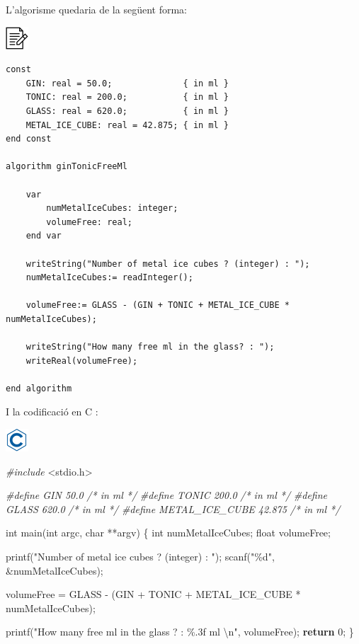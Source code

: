 \documentclass[
]{book}
\newenvironment{Shaded}{\begin{snugshade}}{\end{snugshade}}
\newcommand{\CommentTok}[1]{\textcolor[rgb]{0.56,0.35,0.01}{\textit{#1}}}
\newcommand{\ControlFlowTok}[1]{\textcolor[rgb]{0.13,0.29,0.53}{\textbf{#1}}}
\newcommand{\DataTypeTok}[1]{\textcolor[rgb]{0.13,0.29,0.53}{#1}}
\newcommand{\DecValTok}[1]{\textcolor[rgb]{0.00,0.00,0.81}{#1}}
\newcommand{\ImportTok}[1]{#1}
\newcommand{\NormalTok}[1]{#1}
\newcommand{\PreprocessorTok}[1]{\textcolor[rgb]{0.56,0.35,0.01}{\textit{#1}}}
\newcommand{\SpecialCharTok}[1]{\textcolor[rgb]{0.00,0.00,0.00}{#1}}
\newcommand{\StringTok}[1]{\textcolor[rgb]{0.31,0.60,0.02}{#1}}
\begin{document}
L'algorisme quedaria de la següent forma:

\includegraphics{./img/alg.png}

\begin{verbatim}
const
    GIN: real = 50.0;              { in ml }
    TONIC: real = 200.0;           { in ml }
    GLASS: real = 620.0;           { in ml }
    METAL_ICE_CUBE: real = 42.875; { in ml }
end const

algorithm ginTonicFreeMl

    var
        numMetalIceCubes: integer;
        volumeFree: real;
    end var

    writeString("Number of metal ice cubes ? (integer) : ");
    numMetalIceCubes:= readInteger();

    volumeFree:= GLASS - (GIN + TONIC + METAL_ICE_CUBE * numMetalIceCubes);

    writeString("How many free ml in the glass? : ");
    writeReal(volumeFree);

end algorithm
\end{verbatim}

I la codificació en C :

\includegraphics{./img/c.png}

\begin{Shaded}
\begin{Highlighting}[]
\PreprocessorTok{\#include }\ImportTok{\textless{}stdio.h\textgreater{}}

\PreprocessorTok{\#define GIN 50.0              }\CommentTok{/* in ml */}
\PreprocessorTok{\#define TONIC 200.0           }\CommentTok{/* in ml */}
\PreprocessorTok{\#define GLASS 620.0           }\CommentTok{/* in ml */}
\PreprocessorTok{\#define METAL\_ICE\_CUBE 42.875 }\CommentTok{/* in ml */}

\DataTypeTok{int}\NormalTok{ main(}\DataTypeTok{int}\NormalTok{ argc, }\DataTypeTok{char}\NormalTok{ **argv) \{}
    \DataTypeTok{int}\NormalTok{ numMetalIceCubes;}
    \DataTypeTok{float}\NormalTok{ volumeFree;}

\NormalTok{    printf(}\StringTok{"Number of metal ice cubes ? (integer) : "}\NormalTok{);}
\NormalTok{    scanf(}\StringTok{"\%d"}\NormalTok{, \&numMetalIceCubes);}

\NormalTok{    volumeFree = GLASS {-} (GIN + TONIC + METAL\_ICE\_CUBE * numMetalIceCubes);}

\NormalTok{    printf(}\StringTok{"How many free ml in the glass ? : \%.3f ml }\SpecialCharTok{\textbackslash{}n}\StringTok{"}\NormalTok{, volumeFree);}
    \ControlFlowTok{return} \DecValTok{0}\NormalTok{;}
\NormalTok{\}}
\end{Highlighting}
\end{Shaded}
\end{document}
